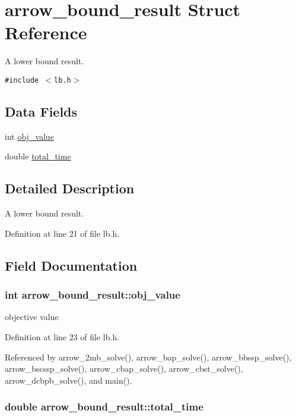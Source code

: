 \hypertarget{structarrow__bound__result}{
\section{arrow\_\-bound\_\-result Struct Reference}
\label{structarrow__bound__result}
}
A lower bound result.  


{\tt \#include $<$lb.h$>$}

\subsection*{Data Fields}
\begin{CompactItemize}
\item 
int \hyperlink{structarrow__bound__result_acbca68de984376a60dbb9893935e0f4}{obj\_\-value}
\item 
double \hyperlink{structarrow__bound__result_d27a3cae43bbe1ed2e2c60a4ef307b08}{total\_\-time}
\end{CompactItemize}


\subsection{Detailed Description}
A lower bound result. 

Definition at line 21 of file lb.h.

\subsection{Field Documentation}
\hypertarget{structarrow__bound__result_acbca68de984376a60dbb9893935e0f4}{
\subsubsection[{obj\_\-value}]{\setlength{\rightskip}{0pt plus 5cm}int {\bf arrow\_\-bound\_\-result::obj\_\-value}}}
\label{structarrow__bound__result_acbca68de984376a60dbb9893935e0f4}


objective value 

Definition at line 23 of file lb.h.

Referenced by arrow\_\-2mb\_\-solve(), arrow\_\-bap\_\-solve(), arrow\_\-bbssp\_\-solve(), arrow\_\-bscssp\_\-solve(), arrow\_\-cbap\_\-solve(), arrow\_\-cbst\_\-solve(), arrow\_\-dcbpb\_\-solve(), and main().\hypertarget{structarrow__bound__result_d27a3cae43bbe1ed2e2c60a4ef307b08}{
\subsubsection[{total\_\-time}]{\setlength{\rightskip}{0pt plus 5cm}double {\bf arrow\_\-bound\_\-result::total\_\-time}}}
\label{structarrow__bound__result_d27a3cae43bbe1ed2e2c60a4ef307b08}


